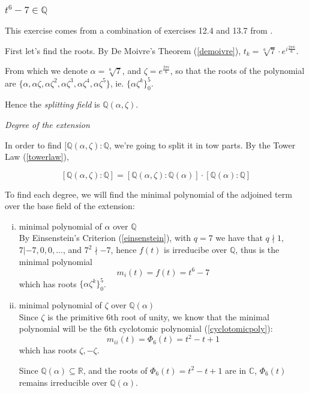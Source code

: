 \documentclass{article}
\theoremstyle{definition}
\begin{document}
\subsubsection[t6-7]{$t^6-7 \in \mathbb{Q}$}

This exercise comes from a combination of exercises 12.4 and 13.7 from \cite{ianstewart}.

First let's find the roots. By De Moivre's Theorem (\ref{demoivre}), $t_k =
\sqrt[6]{7} \cdot e^{i \frac{2 \pi k}{6}}$.

From which we denote $\alpha = \sqrt[6]{7}$, and $\zeta = e^{\frac{2 \pi i}{6}}$, so that the
roots of the polynomial are $\{ \alpha, \alpha \zeta, \alpha \zeta^2, \alpha \zeta^3, \alpha \zeta^4, \alpha \zeta^5\}$, ie. 
$\{ \alpha \zeta^k \}_0^5$.

Hence the \emph{splitting field} is $\mathbb{Q}(\alpha, \zeta)$.

\emph{Degree of the extension}

In order to find $[\mathbb{Q}(\alpha, \zeta) : \mathbb{Q}$, we're going to split it in tow
parts. By the Tower Law (\ref{towerlaw}),

$$[\mathbb{Q}(\alpha, \zeta) : \mathbb{Q}] = [\mathbb{Q}(\alpha, \zeta) : \mathbb{Q}(\alpha)] \cdot [\mathbb{Q}(\alpha) : \mathbb{Q}]$$

To find each degree, we will find the minimal polynomial of the adjoined term over the base field of the extension:

\begin{enumerate}[i.]
  \item minimal polynomial of $\alpha$ over $\mathbb{Q}$\\
    By Einsenstein's Criterion (\ref{einsenstein}), with $q=7$ we have that $q
    \nmid 1$, $7 | {-7,0,0,\ldots}$, and $7^2 \nmid -7$, hence $f(t)$ is
    irreducibe over $\mathbb{Q}$, thus is the minimal polynomial
    $$m_i(t)= f(t) =t^6-7$$
    which has roots $\{ \alpha \zeta^k \}_0^5$.
  \item minimal polynomial of $\zeta$ over $\mathbb{Q}(\alpha)$\\
    Since $\zeta$ is the primitive $6$th root of unity, we know that the minimal
    polynomial will be the $6$th cyclotomic polynomial (\ref{cyclotomicpoly}):
    $$m_{ii}(t) = \Phi_6(t) = t^2 - t + 1$$
    which has roots $\zeta, -\zeta$.

    Since $\mathbb{Q}(\alpha) \subseteq \mathbb{R}$, and the roots of
    $\Phi_6(t)=t^2 - t +1$ are in $\mathbb{C}$, $\Phi_6(t)$ remains irreducible
    over $\mathbb{Q}(\alpha)$.
\end{enumerate}
\end{document}
